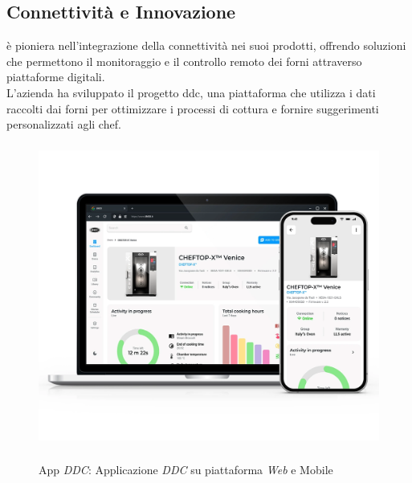 \subsection{Connettività e Innovazione}
\myAzienda è pioniera nell'integrazione della connettività nei suoi prodotti, offrendo soluzioni che permettono il monitoraggio e il controllo remoto dei forni attraverso piattaforme digitali.
\\L'azienda ha sviluppato il progetto \gls{ddc}\glox, una piattaforma che utilizza i dati raccolti dai forni per ottimizzare i processi di cottura e fornire suggerimenti personalizzati agli chef.

\begin{figure}[H]
    \centering
    \includegraphics[alt={Immagine della applicazione \textit{DDC} su piattaforma \textit{Web e Mobile}}, height=10cm]{img/ddc.png}
    \caption{App \textit{DDC}: Applicazione \textit{DDC} su piattaforma \textit{Web} e Mobile}
    \label{fig:ddc}
\end{figure}


